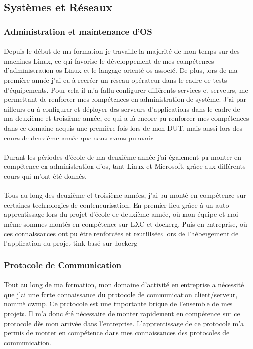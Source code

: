 \documentclass[12pt,a4paper]{report}
\begin{document}
\subsection{Systèmes et Réseaux}
\subsubsection{Administration et maintenance d'OS}
\paragraph*{}Depuis le début de ma formation je travaille la majorité de mon temps sur des machines Linux, ce qui favorise le développement de mes compétences d'administration \gls{os} Linux et le langage orienté \gls{os} associé. De plus, lors de ma première année j'ai eu à recréer un réseau opérateur dans le cadre de tests d'équipements. Pour cela il m'a fallu configurer différents services et serveurs, me permettant de renforcer mes compétences en administration de système. J'ai par ailleurs eu à configurer et déployer des serveurs d'applications dans le cadre de ma deuxième et troisième année, ce qui a là encore pu renforcer mes compétences dans ce domaine acquis une première fois lors de mon DUT, mais aussi lors des cours de deuxième année que nous avons pu avoir.
\paragraph*{}Durant les périodes d'école de ma deuxième année j'ai également pu monter en compétence en administration d'\gls{os}, tant Linux et Microsoft, grâce aux différents cours qui m'ont été donnés.
\paragraph*{}Tous au long des deuxième et troisième années, j'ai pu monté en compétence sur certaines technologies de conteneurisation. En premier lieu grâce à un auto apprentissage lors du projet d'école de deuxième année, où mon équipe et moi-même sommes montés en compétence sur LXC et \gls{dockerg}. Puis en entreprise, où ces connaissances ont pu être renforcées et réutilisées lors de l'hébergement de l'application du projet \gls{tink} basé sur \gls{dockerg}. \\
\subsubsection{Protocole de Communication}
\paragraph*{}Tout au long de ma formation, mon domaine d'activité en entreprise a nécessité que j'ai une forte connaissance du protocole de communication client/serveur, nommé \gls{cwmp}. Ce protocole est une importante brique de l'ensemble de mes projets. Il m'a donc été nécessaire de monter rapidement en compétence sur ce protocole dès mon arrivée dans l'entreprise. L’apprentissage de ce protocole m'a permis de monter en compétence dans mes connaissances des protocoles de communication.
\end{document}

